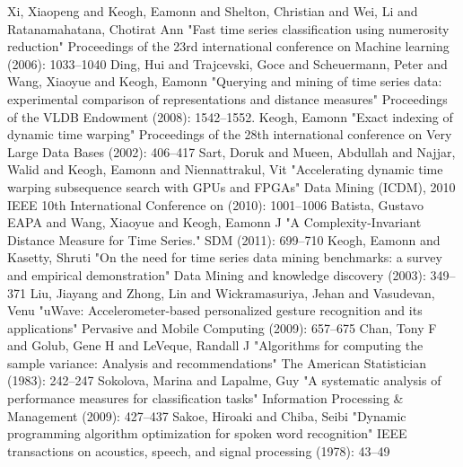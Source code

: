 \begin{thebibliography}{1}
     Xi, Xiaopeng and Keogh, Eamonn and Shelton, Christian and Wei, Li and Ratanamahatana, Chotirat
    Ann "Fast time series classification using numerosity reduction" Proceedings of the 23rd international conference on
    Machine learning (2006): 1033--1040
     Ding, Hui and Trajcevski, Goce and Scheuermann, Peter and Wang, Xiaoyue and Keogh, Eamonn
    "Querying and mining of time series data: experimental comparison of representations and distance measures"
    Proceedings of the VLDB Endowment (2008): 1542--1552.
     Keogh, Eamonn "Exact indexing of dynamic time warping" Proceedings of the 28th
    international conference on Very Large Data Bases (2002): 406--417
     Sart, Doruk and Mueen, Abdullah and Najjar, Walid and Keogh, Eamonn and
    Niennattrakul, Vit "Accelerating dynamic time warping subsequence search with GPUs and FPGAs" Data Mining (ICDM),
    2010 IEEE 10th International Conference on (2010): 1001--1006
     Batista, Gustavo EAPA and Wang, Xiaoyue and Keogh, Eamonn J "A
    Complexity-Invariant Distance Measure for Time Series." SDM (2011): 699--710
     Keogh, Eamonn and Kasetty, Shruti "On the need for time series data mining benchmarks: a
    survey and empirical demonstration" Data Mining and knowledge discovery (2003): 349--371
     Liu, Jiayang and Zhong, Lin and Wickramasuriya, Jehan and Vasudevan, Venu "uWave:
    Accelerometer-based personalized gesture recognition and its applications" Pervasive and Mobile Computing
    (2009): 657--675
     Chan, Tony F and Golub, Gene H and LeVeque, Randall J "Algorithms for computing the
    sample variance: Analysis and recommendations" The American Statistician (1983): 242--247
     Sokolova, Marina and Lapalme, Guy "A systematic analysis of performance measures
    for classification tasks" Information Processing \& Management (2009): 427--437
     Sakoe, Hiroaki and Chiba, Seibi "Dynamic programming algorithm optimization for spoken
    word recognition" IEEE transactions on acoustics, speech, and signal processing (1978): 43--49
\end{thebibliography}
